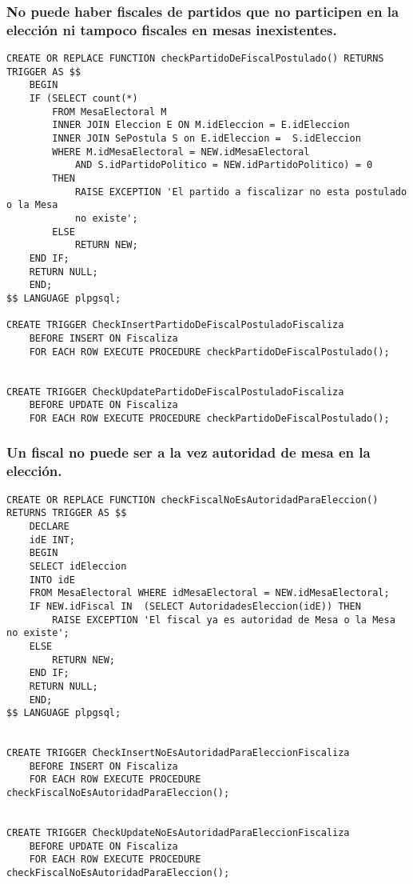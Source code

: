 \subsubsection{No puede haber fiscales de partidos que no participen en la elección ni tampoco fiscales en mesas inexistentes.}
\begin{verbatim}
CREATE OR REPLACE FUNCTION checkPartidoDeFiscalPostulado() RETURNS TRIGGER AS $$
    BEGIN
    IF (SELECT count(*) 
        FROM MesaElectoral M 
        INNER JOIN Eleccion E ON M.idEleccion = E.idEleccion
        INNER JOIN SePostula S on E.idEleccion =  S.idEleccion
        WHERE M.idMesaElectoral = NEW.idMesaElectoral 
            AND S.idPartidoPolitico = NEW.idPartidoPolitico) = 0 
        THEN
            RAISE EXCEPTION 'El partido a fiscalizar no esta postulado o la Mesa
            no existe';              
        ELSE
            RETURN NEW;
    END IF;
    RETURN NULL;
    END;
$$ LANGUAGE plpgsql;

CREATE TRIGGER CheckInsertPartidoDeFiscalPostuladoFiscaliza
    BEFORE INSERT ON Fiscaliza 
    FOR EACH ROW EXECUTE PROCEDURE checkPartidoDeFiscalPostulado();


CREATE TRIGGER CheckUpdatePartidoDeFiscalPostuladoFiscaliza
    BEFORE UPDATE ON Fiscaliza 
    FOR EACH ROW EXECUTE PROCEDURE checkPartidoDeFiscalPostulado();
\end{verbatim}

\subsubsection{Un fiscal no puede ser a la vez autoridad de mesa en la elección.}

\begin{verbatim}
CREATE OR REPLACE FUNCTION checkFiscalNoEsAutoridadParaEleccion() RETURNS TRIGGER AS $$
    DECLARE
    idE INT;
    BEGIN
    SELECT idEleccion 
    INTO idE 
    FROM MesaElectoral WHERE idMesaElectoral = NEW.idMesaElectoral;
    IF NEW.idFiscal IN  (SELECT AutoridadesEleccion(idE)) THEN
        RAISE EXCEPTION 'El fiscal ya es autoridad de Mesa o la Mesa no existe';
    ELSE
        RETURN NEW;
    END IF;
    RETURN NULL;
    END;
$$ LANGUAGE plpgsql;


CREATE TRIGGER CheckInsertNoEsAutoridadParaEleccionFiscaliza
    BEFORE INSERT ON Fiscaliza 
    FOR EACH ROW EXECUTE PROCEDURE checkFiscalNoEsAutoridadParaEleccion();


CREATE TRIGGER CheckUpdateNoEsAutoridadParaEleccionFiscaliza
    BEFORE UPDATE ON Fiscaliza 
    FOR EACH ROW EXECUTE PROCEDURE checkFiscalNoEsAutoridadParaEleccion();
\end{verbatim}

